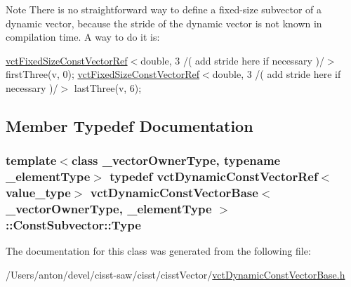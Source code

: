 \begin{DoxyNote}{Note}
There is no straightforward way to define a fixed-\/size subvector of a dynamic vector, because the stride of the dynamic vector is not known in compilation time. A way to do it is\+:
\end{DoxyNote}
\hyperlink{classvct_fixed_size_const_vector_ref}{vct\+Fixed\+Size\+Const\+Vector\+Ref}$<$double, 3 /( add stride here if necessary )/$>$ first\+Three(v, 0); \hyperlink{classvct_fixed_size_const_vector_ref}{vct\+Fixed\+Size\+Const\+Vector\+Ref}$<$double, 3 /( add stride here if necessary )/$>$ last\+Three(v, 6); 

\subsection{Member Typedef Documentation}
\hypertarget{classvct_dynamic_const_vector_base_1_1_const_subvector_adbf4a3fe950a5909deb939cffbb7d9a5}{}
\subsubsection[{Type}]{\setlength{\rightskip}{0pt plus 5cm}template$<$class \+\_\+vector\+Owner\+Type, typename \+\_\+element\+Type$>$ typedef {\bf vct\+Dynamic\+Const\+Vector\+Ref}$<$value\+\_\+type$>$ {\bf vct\+Dynamic\+Const\+Vector\+Base}$<$ \+\_\+vector\+Owner\+Type, \+\_\+element\+Type $>$\+::{\bf Const\+Subvector\+::\+Type}}\label{classvct_dynamic_const_vector_base_1_1_const_subvector_adbf4a3fe950a5909deb939cffbb7d9a5}


The documentation for this class was generated from the following file\+:\begin{DoxyCompactItemize}
\item 
/\+Users/anton/devel/cisst-\/saw/cisst/cisst\+Vector/\hyperlink{vct_dynamic_const_vector_base_8h}{vct\+Dynamic\+Const\+Vector\+Base.\+h}\end{DoxyCompactItemize}
